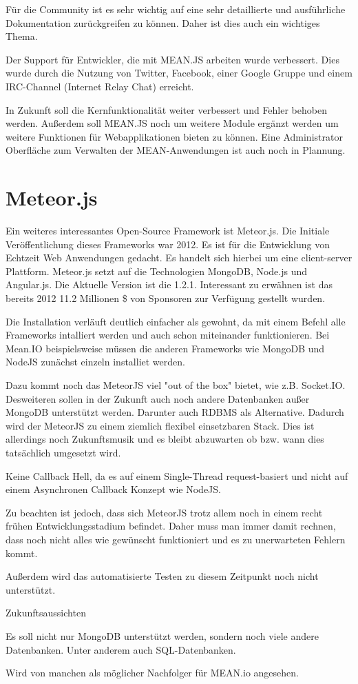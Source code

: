 Für die Community ist es sehr wichtig auf eine sehr detaillierte und ausführliche Dokumentation zurückgreifen zu können. Daher ist dies auch ein wichtiges Thema.

Der Support für Entwickler, die mit MEAN.JS arbeiten wurde verbessert. Dies wurde durch die Nutzung von Twitter, Facebook, einer Google Gruppe und einem IRC-Channel (Internet Relay Chat) erreicht.

In Zukunft soll die Kernfunktionalität weiter verbessert und Fehler behoben werden. Außerdem soll MEAN.JS noch um weitere Module ergänzt werden um weitere Funktionen für Webapplikationen bieten zu können. Eine Administrator Oberfläche zum Verwalten der MEAN-Anwendungen ist auch noch in Plannung.

\section{Meteor.js}\label{meteor.js}

Ein weiteres interessantes Open-Source Framework ist Meteor.js. Die
Initiale Veröffentlichung dieses Frameworks war 2012. Es ist für die
Entwicklung von Echtzeit Web Anwendungen gedacht. Es handelt sich
hierbei um eine client-server Plattform. Meteor.js setzt auf die
Technologien MongoDB, Node.js und Angular.js. Die Aktuelle Version ist
die 1.2.1. Interessant zu erwähnen ist das bereits 2012 11.2 Millionen
\$ von Sponsoren zur Verfügung gestellt wurden.
	
Die Installation verläuft deutlich einfacher als gewohnt, da mit einem Befehl alle Frameworks intalliert werden und auch schon miteinander funktionieren. Bei Mean.IO beispielsweise müssen die anderen Frameworks wie MongoDB und NodeJS zunächst einzeln installiet werden.
	
Dazu kommt noch das MeteorJS viel  "out of the box" bietet, wie z.B. Socket.IO. Desweiteren sollen in der Zukunft auch noch andere Datenbanken außer MongoDB unterstützt werden. Darunter auch RDBMS als Alternative. Dadurch wird der MeteorJS zu einem ziemlich flexibel einsetzbaren Stack. Dies ist allerdings noch Zukunftsmusik und es bleibt abzuwarten ob bzw. wann dies tatsächlich umgesetzt wird.
	
Keine Callback Hell, da es auf einem Single-Thread request-basiert und nicht auf einem Asynchronen Callback Konzept wie NodeJS.
	
Zu beachten ist jedoch, dass sich MeteorJS trotz allem noch in einem recht frühen Entwicklungsstadium befindet. Daher muss man immer damit rechnen, dass noch nicht alles wie gewünscht funktioniert und es zu unerwarteten Fehlern kommt.
	
Außerdem wird das automatisierte Testen zu diesem Zeitpunkt noch nicht unterstützt.

Zukunftsaussichten

Es soll nicht nur MongoDB unterstützt werden, sondern noch viele andere Datenbanken. Unter anderem auch SQL-Datenbanken.

Wird von manchen als möglicher Nachfolger für MEAN.io angesehen.
